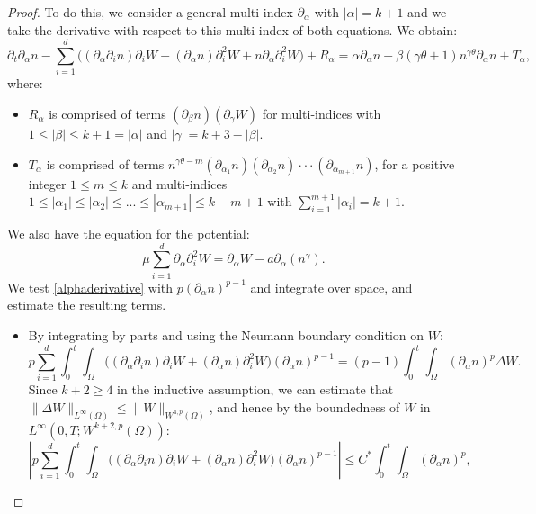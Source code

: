 \documentclass[10pt,a4paper]{amsart}
\begin{document}
\begin{proof}
To do this, we consider a general multi-index $\partial_{\alpha}$ with $|\alpha| = k + 1$ and we take the derivative with respect to this multi-index of both equations. We obtain:
\begin{equation}\label{alphaderivative}
\partial_{t}\partial_{\alpha} n - \sum_{i = 1}^{d} \Big((\partial_{\alpha} \partial_{i} n) \partial_{i}W + (\partial_{\alpha} n) \partial_{i}^{2} W + n\partial_{\alpha} \partial^{2}_{i}W\Big) + R_{\alpha} = \alpha \partial_{\alpha}n - \beta(\gamma \theta + 1)n^{\gamma \theta} \partial_{\alpha} n + T_{\alpha},
\end{equation}
where:
\begin{itemize}
    \item $R_{\alpha}$ is comprised of terms $(\partial_{\beta} n)(\partial_{\gamma} W)$ for multi-indices with $1 \le |\beta| \le k + 1 = |\alpha|$ and $|\gamma| = k + 3 - |\beta|$.
    \item $T_{\alpha}$ is comprised of terms $n^{\gamma \theta - m} (\partial_{\alpha_{1}}n) (\partial_{\alpha_{2}}n) \cdot \cdot \cdot (\partial_{\alpha_{m+1}}n)$, for a positive integer $1 \le m \le k$ and multi-indices $1 \le |\alpha_{1}| \le |\alpha_{2}| \le ... \le |\alpha_{m+1}| \le k - m + 1$ with $\displaystyle \sum_{i = 1}^{m+1} |\alpha_{i}| = k + 1$.
\end{itemize}
We also have the equation for the potential:
\begin{equation}\label{Winductive}
\mu \sum_{i = 1}^{d} \partial_{\alpha} \partial^{2}_{i}W = \partial_{\alpha} W - a \partial_{\alpha} (n^{\gamma}).
\end{equation}
We test \eqref{alphaderivative} with $p(\partial_{\alpha}n)^{p - 1}$ and integrate over space, and estimate the resulting terms.
\begin{itemize}
\item By integrating by parts and using the Neumann boundary condition on $W$:
\begin{equation*}
p\sum_{i = 1}^{d} \int_{0}^{t} \int_{\Omega} \Big((\partial_{\alpha} \partial_{i}n) \partial_{i}W + (\partial_{\alpha} n)\partial^{2}_{i}W\Big) (\partial_{\alpha} n)^{p - 1} = (p - 1)\int_{0}^{t} \int_{\Omega} (\partial_{\alpha} n)^{p} \Delta W. 
\end{equation*}
Since $k + 2 \ge 4$ in the inductive assumption, we can estimate that $\|\Delta W\|_{L^{\infty}(\Omega)} \le \|W\|_{W^{4, p}(\Omega)}$, and hence by the boundedness of $W$ in $L^{\infty}(0, T; W^{k + 2, p}(\Omega))$:
\begin{equation*}
\left|p\sum_{i = 1}^{d} \int_{0}^{t} \int_{\Omega} \Big((\partial_{\alpha} \partial_{i}n) \partial_{i}W + (\partial_{\alpha}n)\partial^{2}_{i}W\Big) (\partial_{\alpha}n)^{p - 1}\right| \le C^{*}\int_{0}^{t} \int_{\Omega} (\partial_{\alpha}n)^{p},

\end{equation*}
\end{itemize}
\end{proof}
\end{document}
